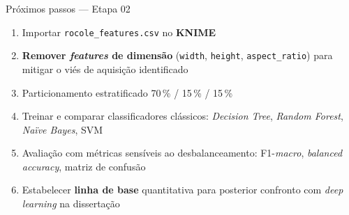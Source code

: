 \documentclass[aspectratio=169,10pt]{beamer}
\begin{document}
\begin{frame}{Próximos passos --- Etapa 02}
  \begin{enumerate}
    \item Importar \texttt{rocole\_features.csv} no \textbf{KNIME}

    \vspace{0.3em}
    \item \textbf{Remover \textit{features} de dimensão} (\texttt{width}, \texttt{height}, \texttt{aspect\_ratio}) para mitigar o viés de aquisição identificado

    \vspace{0.3em}
    \item Particionamento estratificado 70\,\% / 15\,\% / 15\,\%

    \vspace{0.3em}
    \item Treinar e comparar classificadores clássicos: \textit{Decision Tree}, \textit{Random Forest}, \textit{Naïve Bayes}, SVM

    \vspace{0.3em}
    \item Avaliação com métricas sensíveis ao desbalanceamento: F1-\textit{macro}, \textit{balanced accuracy}, matriz de confusão

    \vspace{0.3em}
    \item Estabelecer \textbf{linha de base} quantitativa para posterior confronto com \textit{deep learning} na dissertação
  \end{enumerate}
\end{frame}
\end{document}
